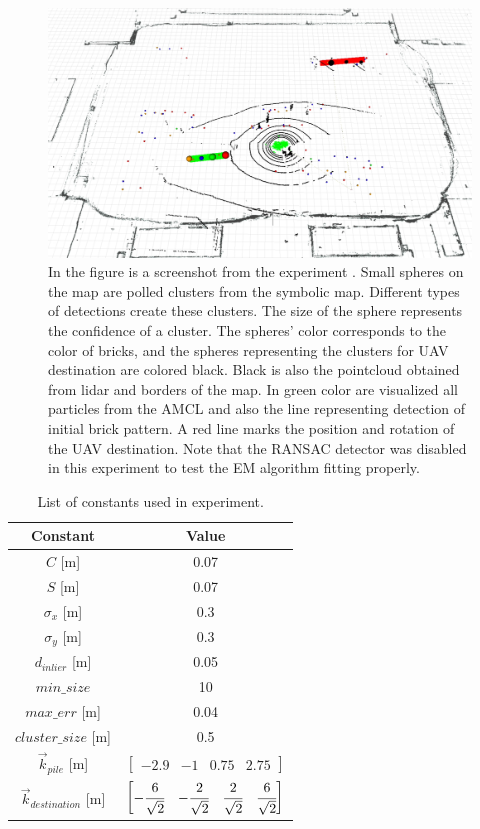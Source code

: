 \begin{figure}[H]
	\centering
	\includegraphics[scale=0.3]{fig/experiment}
	\caption[Experiment results]{In the figure is a screenshot from the experiment \footnotemark. Small spheres on the map are polled clusters from the symbolic map. Different types of detections create these clusters. The size of the sphere represents the confidence of a cluster. The spheres' color corresponds to the color of bricks, and the spheres representing the clusters for UAV destination are colored black. Black is also the pointcloud obtained from lidar and borders of the map. In green color are visualized all particles from the AMCL and also the line representing detection of initial brick pattern. A red line marks the position and rotation of the UAV destination. Note that the RANSAC detector was disabled in this experiment to test the EM algorithm fitting properly.}
	\label{fig:experiment}
\end{figure}

\begin{table}[H]
	\centering
	\begin{tabular}{cc}
		\toprule
		Constant & Value \\
		\midrule
		$C$ [m] & 0.07   \\ 
		$S$ [m] & 0.07  \\
		$\sigma_x$ [m] & 0.3 \\ 
		$\sigma_y$ [m] & 0.3 \\
		$d_{inlier}$ [m] & 0.05 \\ 
		$min\_size$ & 10 \\
		$max\_err$ [m] & 0.04 \\
		$cluster\_size$ [m] & 0.5 \\
		$\vec{k}_{pile} $ [m] & $\begin{bmatrix}
			-2.9 & -1 & 0.75 & 2.75
		\end{bmatrix}$ \\
		$\vec{k}_{destination}$ [m] &
		$\begin{bmatrix}
			-\cfrac{6}{\sqrt{2}} &  -\cfrac{2}{\sqrt{2}} &  \cfrac{2}{\sqrt{2}} &  \cfrac{6}{\sqrt{2}}
		\end{bmatrix}$ \\
		\bottomrule
	\end{tabular}
	\caption{List of constants used in experiment.}
	\label{tab:constants}
\end{table}

